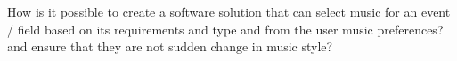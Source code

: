 How is it possible to create a software solution that can select music for an event / field based on its requirements and type and from the user music preferences? and ensure that they are not sudden change in music style?